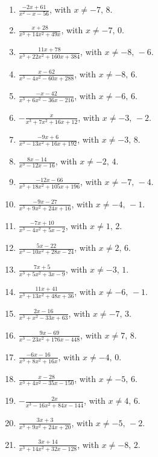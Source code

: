 \documentclass[11pt,oneside]{book}
\begin{document}
\begin{enumerate}[leftmargin=*,label=\textbf{M\arabic*.},itemsep=0.45\baselineskip]
\item $\displaystyle \frac{- 2 x + 61}{x^{2} - x - 56}$, with $x\ne -7,\,8$.
\item $\displaystyle \frac{x + 28}{x^{3} + 14 x^{2} + 49 x}$, with $x\ne -7,\,0$.
\item $\displaystyle \frac{11 x + 78}{x^{3} + 22 x^{2} + 160 x + 384}$, with $x\ne -8,\,-6$.
\item $\displaystyle \frac{x - 62}{x^{3} - 4 x^{2} - 60 x + 288}$, with $x\ne -8,\,6$.
\item $\displaystyle \frac{- x - 42}{x^{3} + 6 x^{2} - 36 x - 216}$, with $x\ne -6,\,6$.
\item $\displaystyle - \frac{x}{x^{3} + 7 x^{2} + 16 x + 12}$, with $x\ne -3,\,-2$.
\item $\displaystyle \frac{- 9 x + 6}{x^{3} - 13 x^{2} + 16 x + 192}$, with $x\ne -3,\,8$.
\item $\displaystyle \frac{8 x - 14}{x^{3} - 12 x - 16}$, with $x\ne -2,\,4$.
\item $\displaystyle \frac{- 12 x - 66}{x^{3} + 18 x^{2} + 105 x + 196}$, with $x\ne -7,\,-4$.
\item $\displaystyle \frac{- 9 x - 27}{x^{3} + 9 x^{2} + 24 x + 16}$, with $x\ne -4,\,-1$.
\item $\displaystyle \frac{- 7 x + 10}{x^{3} - 4 x^{2} + 5 x - 2}$, with $x\ne 1,\,2$.
\item $\displaystyle \frac{5 x - 22}{x^{3} - 10 x^{2} + 28 x - 24}$, with $x\ne 2,\,6$.
\item $\displaystyle \frac{7 x + 5}{x^{3} + 5 x^{2} + 3 x - 9}$, with $x\ne -3,\,1$.
\item $\displaystyle \frac{11 x + 41}{x^{3} + 13 x^{2} + 48 x + 36}$, with $x\ne -6,\,-1$.
\item $\displaystyle \frac{2 x - 16}{x^{3} + x^{2} - 33 x + 63}$, with $x\ne -7,\,3$.
\item $\displaystyle \frac{9 x - 69}{x^{3} - 23 x^{2} + 176 x - 448}$, with $x\ne 7,\,8$.
\item $\displaystyle \frac{- 6 x - 16}{x^{3} + 8 x^{2} + 16 x}$, with $x\ne -4,\,0$.
\item $\displaystyle \frac{x - 28}{x^{3} + 4 x^{2} - 35 x - 150}$, with $x\ne -5,\,6$.
\item $\displaystyle - \frac{2 x}{x^{3} - 16 x^{2} + 84 x - 144}$, with $x\ne 4,\,6$.
\item $\displaystyle \frac{3 x + 3}{x^{3} + 9 x^{2} + 24 x + 20}$, with $x\ne -5,\,-2$.
\item $\displaystyle \frac{3 x + 14}{x^{3} + 14 x^{2} + 32 x - 128}$, with $x\ne -8,\,2$.

\end{enumerate}
\end{document}
